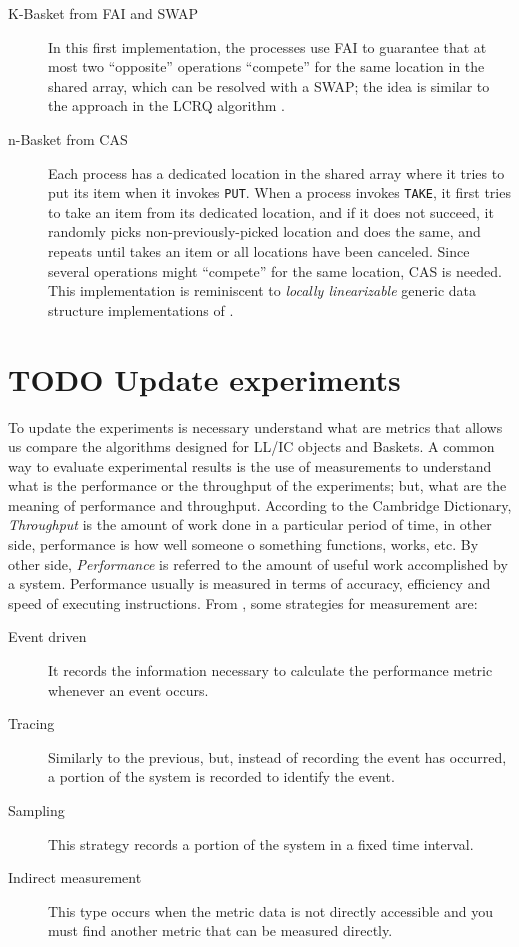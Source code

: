 \documentclass{latex/classes/thesis}
\begin{document}
\begin{description}
\item[{K-Basket from FAI and SWAP}] In this first implementation, the processes
use FAI to guarantee that at most two ``opposite'' operations ``compete''
for the same location in the shared array, which can be resolved with a
SWAP; the idea is similar to the approach in the LCRQ algorithm
\cite{ppopp2013x86queues}.
\item[{n-Basket from CAS}] Each process has a dedicated location in the shared
array where it tries to put its item when it invokes \texttt{PUT}. When a process
invokes \texttt{TAKE}, it first tries to take an item from its dedicated location,
and if it does not succeed, it randomly picks non-previously-picked
location and does the same, and repeats until takes an item or all
locations have been canceled. Since several operations might ``compete''
for the same location, CAS is needed. This implementation is reminiscent
to \emph{locally linearizable} generic data structure implementations of
\cite{DBLP_conf_concur_HaasHHKLPSSV16}.
\end{description}


\section{{\bfseries\sffamily TODO} Update experiments}
\label{sec:org59e805e}

To update the experiments is necessary understand what are metrics that
allows us compare the algorithms designed for LL/IC objects and Baskets. A
common way to evaluate experimental results is the use of measurements to
understand what is the performance or the throughput of the experiments;
but, what are the meaning of performance and throughput. According to the
Cambridge Dictionary, \emph{Throughput} is the amount of work done in a particular
period of time, in other side, performance is how well someone o something
functions, works, etc. By other side, \emph{Performance} is referred to the amount
of useful work accomplished by a system. Performance usually is measured in
terms of accuracy, efficiency and speed of executing instructions. From
\cite{lilja2005measuring}, some strategies for measurement are:

\begin{description}
\item[{Event driven}] It records the information necessary to calculate the
performance metric whenever an event occurs.
\item[{Tracing}] Similarly to the previous, but, instead of recording the event
has occurred, a portion of the system is recorded to identify the event.
\item[{Sampling}] This strategy records a portion of the system in a fixed time
interval.
\item[{Indirect measurement}] This type occurs when the metric data is not
directly accessible and you must find another metric that can be measured
directly.
\end{description}
\end{document}
